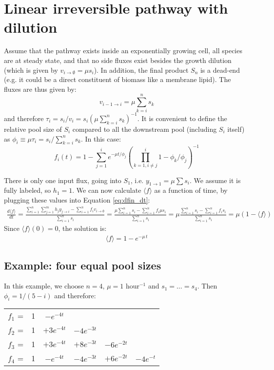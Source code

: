 \documentclass{article}
\newcommand{\fin}{\ensuremath{\langle f \rangle}}
\newcommand{\flux}[2]{\ensuremath{v_{{#1} \rightarrow {#2}}}}
\begin{document}
\section{Linear irreversible pathway with dilution}\label{sec:linear_examples}
Assume that the pathway exists inside an exponentially growing cell, all species are at steady state, and that no side fluxes exist besides the growth dilution (which is given by $\flux{i}{\emptyset} = \mu s_i$). In addition, the final product $S_n$ is a dead-end (e.g. it could be a direct constituent of biomass like a membrane lipid). The fluxes are thus given by:
\begin{equation}
    \flux{i-1}{i} = \mu \sum_{k=i}^n s_k
\end{equation}
and therefore $\tau_i = s_i/v_i = s_i (\mu \sum_{k=i}^n s_k)^{-1}$. It is convenient to define the relative pool size of $S_i$ compared to all the downstream pool (including $S_i$ itself) as $\phi_i \equiv \mu\tau_i = s_i / \sum_{k=i}^n s_k$. In this case:
\begin{equation}\label{eq:dilution}
    f_i(t) = 1 - \sum_{j=1}^{i} e^{- \mu t / \phi_j} \left(\prod_{k = 1, i \neq j}^{i} 1 - \phi_k/\phi_j\right)^{-1}
\end{equation}

There is only one input flux, going into $S_1$, i.e. $y_{1 \rightarrow 1} = \mu \sum s_i$. We assume it is fully labeled, so $h_1 = 1$. We can now calculate $\fin$ as a function of time, by plugging these values into Equation \ref{eq:dfin_dt}:
\begin{eqnarray}
	\frac{d\fin}{dt}
	= 
	\frac{\sum_{i=1}^n \sum_{j=1}^m h_j y_{j \rightarrow i} - \sum_{i=1}^n f_i \flux{i}{\emptyset}}{\sum_{i=1}^{n} s_i} 
	=
	\frac{\mu \sum_{i=1}^{n} s_i - \sum_{i=1}^{n} f_i \mu s_i }{\sum_{i=1}^{n} s_i}
	=
	\mu \frac{\sum_{i=1}^{n} s_i - \sum_{i=1}^{n} f_i s_i }{\sum_{i=1}^{n} s_i}
	=
    \mu \left(1 - \fin\right)
\end{eqnarray}
Since $\fin(0) = 0$, the solution is:
\begin{eqnarray}
	\fin = 1 - e^{-\mu\,t} \label{eq:fin_dilution}
\end{eqnarray}


\subsection{Example: four equal pool sizes}
In this example, we choose $n = 4$, $\mu = 1$ hour$^{-1}$ and $s_1 = \ldots = s_4$. Then $\phi_i = 1/(5-i)$ and therefore:
\begin{center}
\begin{tabular}{cccccc}
    $f_1$ = & 1 & $- e^{-4t}$ &&&\\
    $f_2$ = & 1 & $+ 3 e^{-4t}$ & $- 4 e^{-3t}$ &&\\
    $f_3$ = & 1 & $+ 3 e^{-4t}$ & $+ 8 e^{-3t}$ & $- 6 e^{-2t}$ &\\
    $f_4$ = & 1 & $- e^{-4t}$   & $- 4 e^{-3t}$ & $+ 6 e^{-2t}$ & $- 4 e^{-t}$
\end{tabular}
\end{center}
\end{document}
